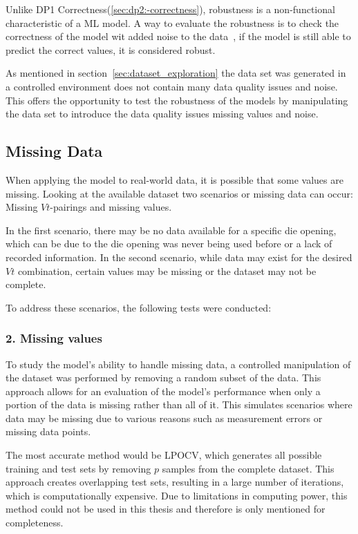 Unlike DP1 Correctness(\ref{sec:dp2:-correctness}), robustness is a
non-functional characteristic
of a \ac{ML} model.
A way to evaluate the robustness is to check the correctness of the model wit
added noise to the data~\cite[p. 18]{zhou_machinelearning_2021}, if the model
is still able to
predict the correct values, it is considered robust.

As mentioned in section~\ref{sec:dataset_exploration} the data set
was generated in a controlled environment does not contain many data quality
issues and noise.
This offers the opportunity to test the robustness of the models by
manipulating the data set
to introduce the data quality issues missing values and noise.

\subsection{Missing Data}\label{subsec:missing-data}
When applying the model to real-world data, it is possible that some values
are missing.
Looking at the available dataset two scenarios or missing data can occur:
Missing $Vt$-pairings
and missing values.

In the first scenario, there may be no data available for a specific die
opening, which can be due to the die opening was never being used before or a
lack of recorded
information.
In the second scenario, while data may exist for the desired $Vt$
combination, certain values may
be missing or the dataset may not be complete.


To address these scenarios, the following tests were conducted:

\subsubsection*{2. Missing values}
To study the model's ability to handle missing data, a controlled manipulation
of the dataset was performed by removing a random subset of the data.
This approach allows for an evaluation of the model's performance when only a
portion of the data
is missing rather than all of it.
This simulates scenarios where data may be missing due to various reasons
such as measurement
errors or missing data points.

The most accurate method would be \ac{LPOCV}, which generates all possible
training and test
sets by removing $p$ samples from the complete dataset.
This approach creates overlapping test sets, resulting in a large number of
iterations, which is
computationally expensive.
Due to limitations in computing power, this method could not be used in this
thesis and therefore
is only mentioned for completeness.

